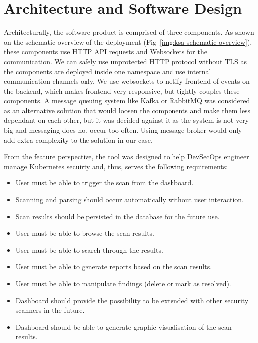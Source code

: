\section{Architecture and Software Design}
\label{sec:architecture}

Architecturally, the software product is comprised of three components. As shown on the schematic overview of the deployment (Fig~\ref{img:ksa-schematic-overview}), these components use HTTP API requests and Websockets for the communication. We can safely use unprotected HTTP protocol without TLS as the components are deployed inside one namespace and use internal communication channels only. We use websockets to notify frontend of events on the backend, which makes frontend very responsive, but tightly couples these components. A message queuing system like Kafka or RabbitMQ was considered as an alternative solution that would loosen the components and make them less dependant on each other, but it was decided against it as the system is not very big and messaging does not occur too often. Using message broker would only add extra complexity to the solution in our case.

From the feature perspective, the tool was designed to help DevSecOps engineer manage Kubernetes secuirty and, thus, serves the following requirements:
\begin{itemize}[noitemsep]
    \item User must be able to trigger the scan from the dashboard.
    \item Scanning and parsing should occur automatically without user interaction.
    \item Scan results should be persisted in the database for the future use.
    \item User must be able to browse the scan results.
    \item User must be able to search through the results.
    \item User must be able to generate reports based on the scan results.
    \item User must be able to manipulate findings (delete or mark as resolved).
    \item Dashboard should provide the possibility to be extended with other security scanners in the future.
    \item Dashboard should be able to generate graphic visualisation of the scan results.
\end{itemize}

